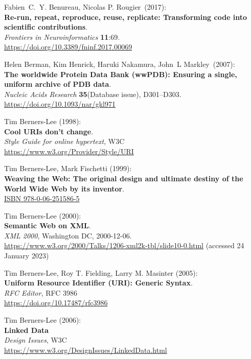 \begin{thebibliography}{9}
Fabien~C.~Y. Benureau, Nicolas P. Rougier~(2017):\\
\textbf{Re-run, repeat, reproduce, reuse, replicate: Transforming code
into scientific contributions}.\\
\emph{Frontiers in Neuroinformatics} \textbf{11}:69.\\
\url{https://doi.org/10.3389/fninf.2017.00069}

Helen Berman, Kim Henrick, Haruki Nakamura, John~L Markley~(2007):\\
\textbf{The worldwide Protein Data Bank (wwPDB): Ensuring a single,
uniform archive of PDB data}.\\
\emph{Nucleic Acids Research} \textbf{35}(Database issue),
D301--D303.\\
\url{https://doi.org/10.1093/nar/gkl971}

Tim Berners-Lee (1998): \\
\textbf{Cool {URIs} don't change}. \\
\emph{Style Guide for online hypertext}, W3C \\
\url{https://www.w3.org/Provider/Style/URI} 

Tim Berners-Lee, Mark Fischetti (1999): \\
\textbf{Weaving the {Web}: The original design and ultimate destiny of the {World Wide Web} by its
inventor}.\\
\href{https://identifiers.org/isbn/9780062515865}{ISBN 978-0-06-251586-5}

Tim Berners-Lee (2000): \\
\textbf{Semantic Web on XML}. \\
\emph{XML 2000}, Washington DC, 2000-12-06. \\
\url{https://www.w3.org/2000/Talks/1206-xml2k-tbl/slide10-0.html}
(accessed 24 January 2023)

Tim Berners-Lee, Roy T. Fielding, Larry M. Masinter (2005): \\
\textbf{Uniform {Resource Identifier} ({URI}): {Generic Syntax}}.\\
\emph{RFC Editor}, RFC 3986 \\
\url{https://doi.org/10.17487/rfc3986}

Tim Berners-Lee (2006): \\
\textbf{Linked {Data}}\\
\emph{Design Issues}, W3C \\
\url{https://www.w3.org/DesignIssues/LinkedData.html}


\end{thebibliography}
